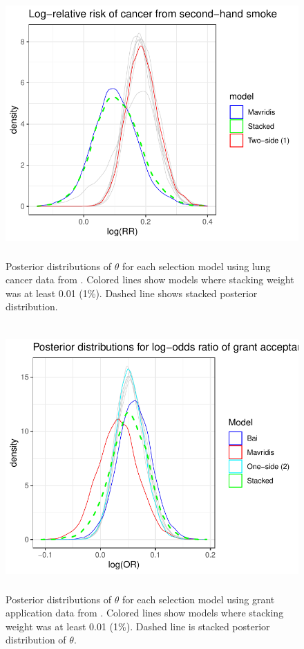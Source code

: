 \documentclass[12pt]{article}   	%
\numberwithin{equation}{section}
\begin{document}
\begin{figure}
\includegraphics[height = 4in, width = 5in]{hackshaw_post.pdf}
\caption{Posterior distributions of $\theta$ for each selection model using lung cancer data from \citet{hackshaw1997}. Colored lines show models where stacking weight was at least 0.01 (1\%).
Dashed line shows stacked posterior distribution.}
\label{fig:hackshaw}
\end{figure}


\begin{figure}
\includegraphics[height = 4in, width = 5in]{bornmann_post.pdf}
\caption{Posterior distributions of $\theta$ for each selection model using grant application data from \citet{bornmann2007gender}. Colored lines show models where stacking weight was at least 0.01 (1\%).
Dashed line is stacked posterior distribution of $\theta$.}
\label{fig:bornmann}
\end{figure}
\end{document}

